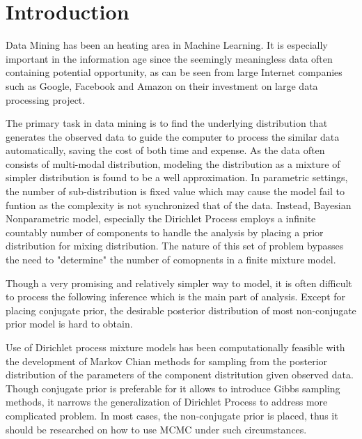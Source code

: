 \section{Introduction}
\indent Data Mining has been an heating area in Machine Learning. It is especially important in the information age since the seemingly meaningless data often containing potential opportunity, as can be seen from large Internet companies such as Google, Facebook and Amazon \cite{mcafee2012big}on their investment on large data processing project. 

The primary task in data mining is to find the underlying distribution that generates the observed data to guide the computer to process the similar data automatically, saving the cost of both time and expense. As the data often consists of multi-modal distribution, modeling the distribution as a mixture of simpler distribution is found to be a well approximation. In parametric settings, the number of sub-distribution is fixed value which may cause the model fail to funtion as the complexity is not synchronized that of the data. Instead, Bayesian Nonparametric model, especially the Dirichlet Process employs a infinite countably number of components to handle the analysis by placing a prior distribution for mixing distribution. The nature of this set of problem bypasses the need to "determine" the number of comopnents in a finite mixture model. 

Though a very promising and relatively simpler way to model, it is often difficult to process the following inference which is the main part of analysis. Except for placing conjugate prior, the desirable posterior distribution of most non-conjugate prior model is hard to obtain. 

Use of Dirichlet process mixture models has been computationally feasible with the development of Markov Chian methods for sampling from the posterior distribution of the parameters of the component distritution given observed data. Though conjugate prior is preferable for it allows to introduce Gibbs sampling methods, it narrows the generalization of Dirichlet Process to address more complicated problem. In most cases, the non-conjugate prior is placed, thus it should be researched on how to use MCMC under such circumstances.

 



